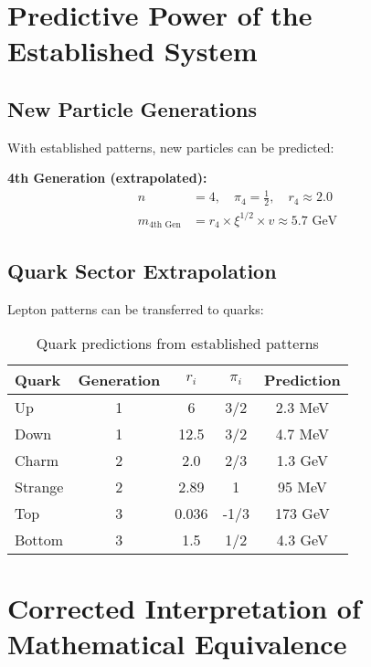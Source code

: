 \documentclass[12pt,a4paper]{article}
\begin{document}
	\section{Predictive Power of the Established System}
	\label{sec:predictive_power}
	
	\subsection{New Particle Generations}
	\label{subsec:new_generations}
	
	With established patterns, new particles can be predicted:
	
	\textbf{4th Generation (extrapolated):}
	\begin{align}
		n &= 4, \quad \pi_4 = \frac{1}{2}, \quad r_4 \approx 2.0 \\
		m_{\text{4th Gen}} &= r_4 \times \xi^{1/2} \times v \approx 5.7 \text{ GeV}
	\end{align}
	
	\subsection{Quark Sector Extrapolation}
	\label{subsec:quark_extrapolation}
	
	Lepton patterns can be transferred to quarks:
	
	\begin{table}[H]
		\centering
		\begin{tabular}{lcccc}
			\toprule
			\textbf{Quark} & \textbf{Generation} & \textbf{$r_i$} & \textbf{$\pi_i$} & \textbf{Prediction} \\
			\midrule
			Up & 1 & 6 & 3/2 & 2.3 MeV \\
			Down & 1 & 12.5 & 3/2 & 4.7 MeV \\
			Charm & 2 & 2.0 & 2/3 & 1.3 GeV \\
			Strange & 2 & 2.89 & 1 & 95 MeV \\
			Top & 3 & 0.036 & -1/3 & 173 GeV \\
			Bottom & 3 & 1.5 & 1/2 & 4.3 GeV \\
			\bottomrule
		\end{tabular}
		\caption{Quark predictions from established patterns}
		\label{tab:quark_predictions}
	\end{table}
	
	\section{Corrected Interpretation of Mathematical Equivalence}
	\label{sec:corrected_interpretation}
	
\end{document}

